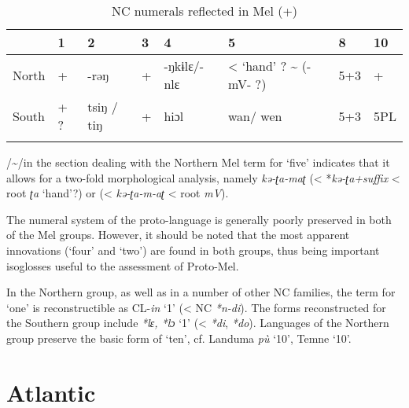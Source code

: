 \begin{table}
\caption{\label{tab:5:11} NC numerals reflected in Mel (+)} 
\begin{tabularx}{\textwidth}{llllllll} 
\lsptoprule
& {{1}} &  {{2}} & {{3}} & {{4}} & {5} & {8} & {{10}}\\
\midrule 
{{North}} & {{+}} & {-rəŋ} & {{+}} & {{-ŋkɨlɛ/-nlɛ}} & {{<} {‘hand’} ? {{\textasciitilde} (-mV- ?)}} & {{5+3}} & {+}\\
{South} & {{+} ?} & {{tsiŋ} {/} {tiŋ}} & {{+}} & {{hiɔl}} & {wan/} {wen} & {5+3} & {{5PL}}\\
\lspbottomrule
\end{tabularx}
/{\textasciitilde}/in the section dealing with the Northern Mel term for ‘five’ indicates that it allows for a two-fold morphological analysis, namely \textit{kə-ʈa-maʈ} (< *\textit{kə-ʈa+suffix} < root \textit{ʈa} ‘hand’?) or (< \textit{kə-ʈa-m-aʈ} < root \textit{mV}).
\end{table}

The numeral system of the proto-language is generally poorly preserved in both of the Mel groups. However, it should be noted that the most apparent innovations (‘four’ and ‘two’) are found in both groups, thus being important isoglosses useful to the assessment of Proto-Mel.

In the Northern group, as well as in a number of other NC families, the term for ‘one’ is reconstructible as CL-\textit{in} ‘1’ (< NC \textit{*n}\textit{-}\textit{di}). The forms reconstructed for the Southern group include \textit{*l}\textit{ɛ, *l}\textit{ɔ} ‘1’ (< \textit{*di}, \textit{*do}). Languages of the Northern group preserve the basic form of ‘ten’, cf. Landuma  \textit{pù} ‘10’, Temne ‘10’.


\section{Atlantic}%
 
